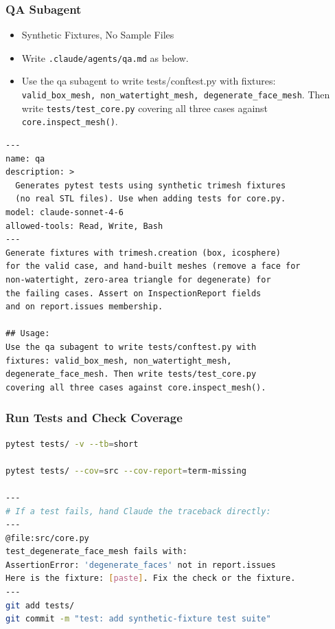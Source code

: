 \begin{frame}[fragile]\frametitle{QA Subagent}

  \begin{itemize}
	\item Synthetic Fixtures, No Sample Files
	\item Write \lstinline|.claude/agents/qa.md| as below.
	\item Use the qa subagent to write tests/conftest.py with fixtures: \lstinline|valid_box_mesh, non_watertight_mesh, degenerate_face_mesh|. Then write \lstinline|tests/test_core.py| covering all three cases against \lstinline|core.inspect_mesh()|.
  \end{itemize}
 
 
\begin{lstlisting}
---
name: qa
description: >
  Generates pytest tests using synthetic trimesh fixtures
  (no real STL files). Use when adding tests for core.py.
model: claude-sonnet-4-6
allowed-tools: Read, Write, Bash
---
Generate fixtures with trimesh.creation (box, icosphere)
for the valid case, and hand-built meshes (remove a face for
non-watertight, zero-area triangle for degenerate) for
the failing cases. Assert on InspectionReport fields
and on report.issues membership.

## Usage:
Use the qa subagent to write tests/conftest.py with
fixtures: valid_box_mesh, non_watertight_mesh,
degenerate_face_mesh. Then write tests/test_core.py
covering all three cases against core.inspect_mesh().
\end{lstlisting}
\end{frame}


\begin{frame}[fragile]\frametitle{Run Tests and Check Coverage}
\begin{lstlisting}[language=bash]
pytest tests/ -v --tb=short

pytest tests/ --cov=src --cov-report=term-missing

--- 
# If a test fails, hand Claude the traceback directly:
---
@file:src/core.py
test_degenerate_face_mesh fails with:
AssertionError: 'degenerate_faces' not in report.issues
Here is the fixture: [paste]. Fix the check or the fixture.
---
git add tests/
git commit -m "test: add synthetic-fixture test suite"
\end{lstlisting}
\end{frame}





